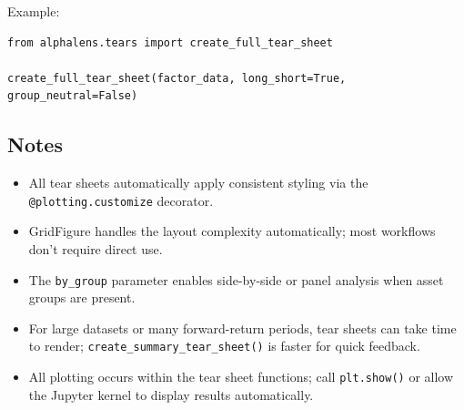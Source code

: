 \documentclass[11pt]{article}
\begin{document}
Example:

\begin{verbatim}
from alphalens.tears import create_full_tear_sheet

create_full_tear_sheet(factor_data, long_short=True, group_neutral=False)
\end{verbatim}

\subsection{Notes}

\begin{itemize}
  \item All tear sheets automatically apply consistent styling via the \texttt{@plotting.customize} decorator.
  \item GridFigure handles the layout complexity automatically; most workflows don't require direct use.
  \item The \texttt{by\_group} parameter enables side-by-side or panel analysis when asset groups are present.
  \item For large datasets or many forward-return periods, tear sheets can take time to render; \texttt{create\_summary\_tear\_sheet()} is faster for quick feedback.
  \item All plotting occurs within the tear sheet functions; call \texttt{plt.show()} or allow the Jupyter kernel to display results automatically.
\end{itemize}
\end{document}

